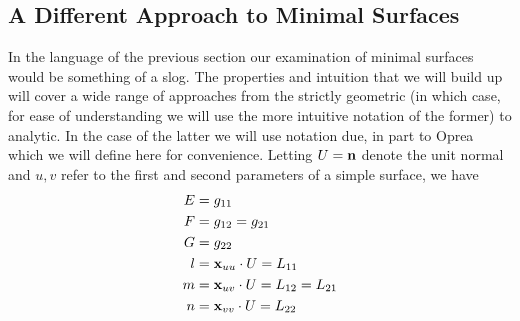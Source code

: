 \subsection{A Different Approach to Minimal Surfaces}
\label{ss:opreaSrf}
In the language of the previous section our examination of minimal surfaces would be something of a slog. The properties and intuition that we will build up will cover a wide range of approaches from the strictly geometric (in which case, for ease of understanding we will use the more intuitive notation of the former) to analytic. In the case of the latter we will use notation due, in part to Oprea which we will define here for convenience. Letting $U = \mathbf{n}$ denote the unit normal and $u, v$ refer to the first and second parameters of a simple surface, we have
\begin{align*}
  E &= g_{11}\\
  F &= g_{12} = g_{21}\\
  G &= g_{22}\\
  l &= \mathbf{x}_{uu}\cdot U = L_{11}\\
  m &= \mathbf{x}_{uv}\cdot U = L_{12} = L_{21}\\
  n &= \mathbf{x}_{vv}\cdot U = L_{22}\\
\end{align*}


